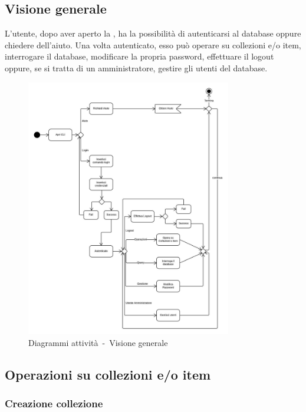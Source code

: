 \documentclass{scalatekids-article}
\begin{document}
\subsection{Visione generale}

L'utente, dopo aver aperto la , ha la possibilità di autenticarsi
al database oppure chiedere dell'aiuto. Una volta autenticato, esso può
operare su collezioni e/o item, interrogare il database, modificare la propria
password, effettuare il logout oppure, se si tratta di un amministratore,
gestire gli utenti del database.

\begin{figure}[H]
  \begin{center}
    \includegraphics[width=0.8\textwidth, keepaspectratio]{img/diagrammiAttivita/visioneGenerale.jpeg}
    \caption{Diagrammi attività\ -\ Visione generale}
  \end{center}
\end{figure}

\subsection{Operazioni su collezioni e/o item}
\subsubsection{Creazione collezione}
\end{document}
